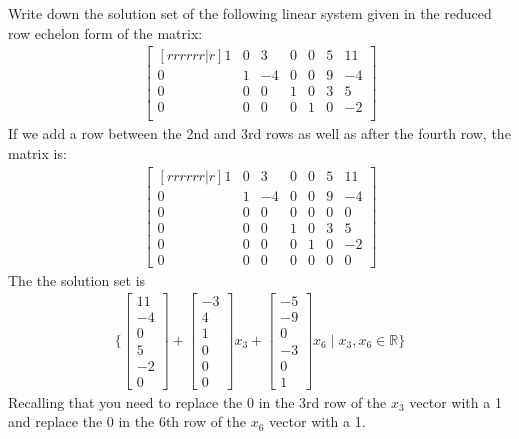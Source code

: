 \begin{example}
Write down the solution set of the following linear system given in the reduced row echelon form of the matrix:
%
\begin{align*}
\begin{bmatrix}[rrrrrr|r]
1 & 0 & 3 & 0 & 0 & 5  & 11 \\
0 & 1 & -4 & 0 & 0 & 9 & -4 \\
0 & 0 & 0 & 1 & 0 & 3  & 5 \\
0 & 0 & 0 & 0 & 1 & 0 & -2 \\
\end{bmatrix}
\end{align*}
If we add a row between the 2nd and 3rd rows as well as after the fourth row, the matrix is:
%
\begin{align*}
\begin{bmatrix}[rrrrrr|r]
1 & 0 & 3 & 0 & 0 & 5  & 11 \\
0 & 1 & -4 & 0 & 0 & 9 & -4 \\
0 & 0 & 0 & 0 & 0 & 0 & 0 \\
0 & 0 & 0 & 1 & 0 & 3  & 5 \\
0 & 0 & 0 & 0 & 1 & 0 & -2 \\
0 & 0 & 0 & 0 & 0 & 0 & 0
\end{bmatrix}
\end{align*}
The the solution set is
%
\begin{align*}
\{ \begin{bmatrix}
11 \\ -4 \\ 0 \\ 5 \\ -2 \\ 0
\end{bmatrix} + \begin{bmatrix}
-3 \\ 4 \\ 1 \\ 0 \\ 0 \\ 0
\end{bmatrix} x_3 +
\begin{bmatrix}
-5 \\ -9 \\ 0 \\ -3 \\ 0 \\ 1
\end{bmatrix} x_6 \; | \; x_3, x_6 \in \mathbb{R} \}
\end{align*}
Recalling that you need to replace the 0 in the 3rd row of the $x_3$ vector with a 1  and replace the 0 in the 6th row of the $x_6$ vector with a 1.
\end{example}

